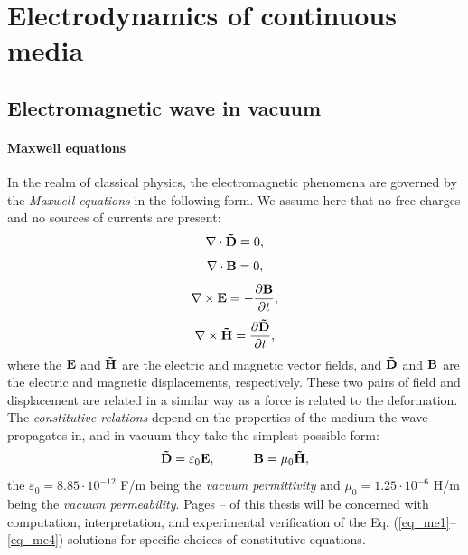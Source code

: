 



\section{Electrodynamics of continuous media} 
\subsection{Electromagnetic wave in vacuum} %
\paragraph{Maxwell equations}  %
In the realm of classical physics, the electromagnetic phenomena are governed by the \textit{Maxwell equations} in the following form.
We assume here that no free charges and no sources of currents are present: 
\begin{equation} \nabla \cdot  \mathbf{\tilde{D}} = 0, \label{eq_me1}\end{equation}  
\begin{equation} \nabla \cdot  \mathbf{B} = 0, \label{eq_me2}\end{equation}  
\begin{equation} \nabla \times \mathbf{E} = -\frac{\partial \mathbf{B}} {\partial t}, \label{eq_me3}\end{equation}  
\begin{equation} \nabla \times \mathbf{\tilde{H}} =  \frac{\partial \mathbf{\tilde{D}}} {\partial t}, \label{eq_me4}\end{equation}  
where the $\mathbf{E}$ and $\mathbf{\tilde{H}}$ are the electric and magnetic vector fields, and $\mathbf{\tilde{D}}$ and $\mathbf{B}$ are the electric and magnetic displacements,
 respectively. These two pairs of field and displacement are related in a similar way as a force is related to the deformation. %
 The \textit{constitutive relations} depend on the properties of the medium the wave propagates in, and in vacuum they take the simplest possible form:
\begin{equation}		\mathbf{\tilde{D}} = \varepsilon_0	\mathbf{E}, \quad\quad\quad						\mathbf{B} = \mu_0			\mathbf{\tilde{H}},				 \label{eq_ce}\end{equation}
the $\varepsilon_0 = 8.85\cdot10^{-12}$ F/m being the \textit{vacuum permittivity} and $\mu_0 = 1.25\cdot10^{-6}$ H/m being the \textit{vacuum permeability}. 
Pages \pageref{starttext}--\pageref{endtext} of this thesis will be concerned with computation, interpretation, and experimental verification of the Eq. (\ref{eq_me1}--\ref{eq_me4}) solutions for specific choices of constitutive equations.
\label{starttext}

